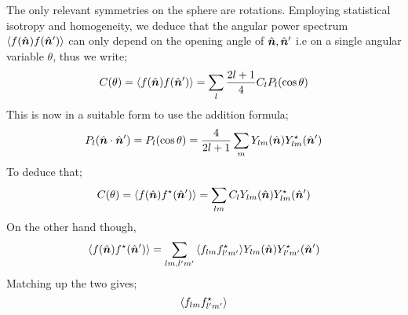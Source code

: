 \begin{definitionbox}
The only relevant symmetries on the sphere are rotations. Employing statistical isotropy and homogeneity, we deduce that the angular power spectrum $\left< f(\nhat) f(\nhat\pr) \right>$ can only depend on the opening angle of $\hat{\bm{n}}, \hat{\bm{n}}^{\prime}$ i.e on a single angular variable $\theta$, thus we write;
\begin{equation}
C(\theta) = \left< f(\nhat)f(\nhat\pr) \right> = \sum_{l}{\frac{2l + 1}{4}C_l P_l(\cos \theta)}
\end{equation}
This is now in a suitable form to use the addition formula;
\begin{equation}
P_l(\hat{\bm{n}} \cdot \hat{\bm{n}}^{\prime}) = P_l(\cos \theta) = \frac{4}{2l + 1}\sum_{m}{Y_{lm}(\hat{\bm{n}}) Y_{lm}^{\star}(\hat{\bm{n}}^{\prime})}
\end{equation}
To deduce that;
\begin{equation*}
C(\theta) = \left< f(\nhat)f^{\star}(\nhat\pr) \right> = \sum_{lm}{C_l Y_{lm}(\nhat) Y^{\star}_{lm}(\nhat\pr)}
\end{equation*}
On the other hand though, 
\begin{equation*}
\left< f(\nhat)f^{\star}(\nhat\pr) \right> = \sum_{lm, l\pr m\pr}{\left< f_{lm}f^{\star}_{l\pr m\pr} \right> Y_{lm}(\nhat)Y^{\star}_{l\pr m\pr}(\nhat\pr)}
\end{equation*}
Matching up the two gives;
\begin{equation}
\left< f_{lm} f^{\star}_{l\pr m\pr} \right>
\end{equation}
\end{definitionbox}
